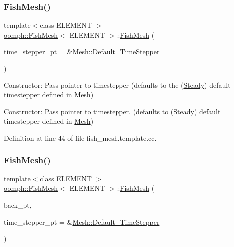 \subsubsection{\texorpdfstring{Fish\+Mesh()}{FishMesh()}\hspace{0.1cm}{\footnotesize\ttfamily [1/2]}}
{\footnotesize\ttfamily template$<$class E\+L\+E\+M\+E\+NT $>$ \\
\hyperlink{classoomph_1_1FishMesh}{oomph\+::\+Fish\+Mesh}$<$ E\+L\+E\+M\+E\+NT $>$\+::\hyperlink{classoomph_1_1FishMesh}{Fish\+Mesh} (\begin{DoxyParamCaption}\item[{\hyperlink{classoomph_1_1TimeStepper}{Time\+Stepper} $\ast$}]{time\+\_\+stepper\+\_\+pt = {\ttfamily \&\hyperlink{classoomph_1_1Mesh_a12243d0fee2b1fcee729ee5a4777ea10}{Mesh\+::\+Default\+\_\+\+Time\+Stepper}} }\end{DoxyParamCaption})}



Constructor\+: Pass pointer to timestepper (defaults to the (\hyperlink{classoomph_1_1Steady}{Steady}) default timestepper defined in \hyperlink{classoomph_1_1Mesh}{Mesh}) 

Constructor\+: Pass pointer to timestepper. (defaults to (\hyperlink{classoomph_1_1Steady}{Steady}) default timestepper defined in \hyperlink{classoomph_1_1Mesh}{Mesh}) 

Definition at line 44 of file fish\+\_\+mesh.\+template.\+cc.

\mbox{\label{classoomph_1_1FishMesh_ac0b931509ec02c03f8ee5676355f196b}} 
\subsubsection{\texorpdfstring{Fish\+Mesh()}{FishMesh()}\hspace{0.1cm}{\footnotesize\ttfamily [2/2]}}
{\footnotesize\ttfamily template$<$class E\+L\+E\+M\+E\+NT $>$ \\
\hyperlink{classoomph_1_1FishMesh}{oomph\+::\+Fish\+Mesh}$<$ E\+L\+E\+M\+E\+NT $>$\+::\hyperlink{classoomph_1_1FishMesh}{Fish\+Mesh} (\begin{DoxyParamCaption}\item[{\hyperlink{classoomph_1_1GeomObject}{Geom\+Object} $\ast$}]{back\+\_\+pt,  }\item[{\hyperlink{classoomph_1_1TimeStepper}{Time\+Stepper} $\ast$}]{time\+\_\+stepper\+\_\+pt = {\ttfamily \&\hyperlink{classoomph_1_1Mesh_a12243d0fee2b1fcee729ee5a4777ea10}{Mesh\+::\+Default\+\_\+\+Time\+Stepper}} }\end{DoxyParamCaption})}



